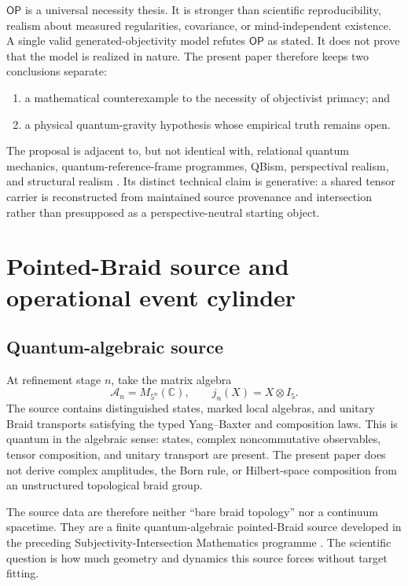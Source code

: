 \documentclass[11pt]{article}
\theoremstyle{definition}
\theoremstyle{remark}
\newcommand{\cA}{\mathcal{A}}
\newcommand{\OPT}{\mathsf{OP}}
\begin{document}
$\OPT$ is a universal necessity thesis. It is stronger than scientific reproducibility, realism about measured regularities, covariance, or mind-independent existence. A single valid generated-objectivity model refutes $\OPT$ as stated. It does not prove that the model is realized in nature. The present paper therefore keeps two conclusions separate:
\begin{enumerate}
\item a mathematical counterexample to the necessity of objectivist primacy; and
\item a physical quantum-gravity hypothesis whose empirical truth remains open.
\end{enumerate}

The proposal is adjacent to, but not identical with, relational quantum mechanics, quantum-reference-frame programmes, QBism, perspectival realism, and structural realism \cite{rovelli1996,giacomini2019,vanrietvelde2020,fuchs2013,massimi2022,ladyman1998,weyl1952}. Its distinct technical claim is generative: a shared tensor carrier is reconstructed from maintained source provenance and intersection rather than presupposed as a perspective-neutral starting object.

\section{Pointed-Braid source and operational event cylinder}

\subsection{Quantum-algebraic source}

At refinement stage $n$, take the matrix algebra
\begin{equation}
 \cA_n=M_{5^n}(\mathbb C),\qquad
 j_n(X)=X\otimes I_5.
\end{equation}
The source contains distinguished states, marked local algebras, and unitary Braid transports satisfying the typed Yang--Baxter and composition laws. This is quantum in the algebraic sense: states, complex noncommutative observables, tensor composition, and unitary transport are present. The present paper does not derive complex amplitudes, the Born rule, or Hilbert-space composition from an unstructured topological braid group.

The source data are therefore neither ``bare braid topology'' \cite{artin1947} nor a continuum spacetime. They are a finite quantum-algebraic pointed-Braid source developed in the preceding Subjectivity-Intersection Mathematics programme \cite{watanabe2026braid,watanabe2026ontology}. The scientific question is how much geometry and dynamics this source forces without target fitting.
\end{document}
